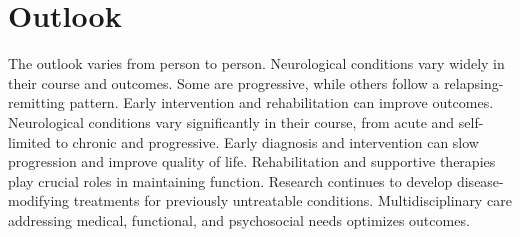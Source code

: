 \section{Outlook}
The outlook varies from person to person. Neurological conditions vary widely in their course and outcomes. Some are progressive, while others follow a relapsing-remitting pattern. Early intervention and rehabilitation can improve outcomes. Neurological conditions vary significantly in their course, from acute and self-limited to chronic and progressive. Early diagnosis and intervention can slow progression and improve quality of life. Rehabilitation and supportive therapies play crucial roles in maintaining function. Research continues to develop disease-modifying treatments for previously untreatable conditions. Multidisciplinary care addressing medical, functional, and psychosocial needs optimizes outcomes.
